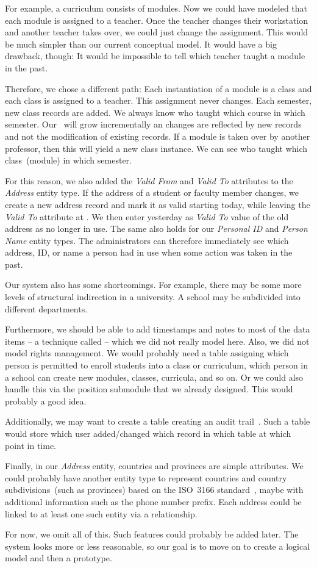 For example, a curriculum consists of modules.
Now we could have modeled that each module is assigned to a teacher.
Once the teacher changes their workstation and another teacher takes over, we could just change the assignment.
This would be much simpler than our current conceptual model.
It would have a big drawback, though:
It would be impossible to tell which teacher taught a module in the past.

Therefore, we chose a different path:
Each instantiation of a module is a class and each class is assigned to a teacher.
This assignment never changes.
Each semester, new class records are added.
We always know who taught which course in which semester.
Our \db\ will grow incrementally an changes are reflected by new records and not the modification of existing records.
If a module is taken over by another professor, then this will yield a new class instance.
We can see who taught which class~(module) in which semester.

For this reason, we also added the \emph{Valid From} and \emph{Valid To} attributes to the \emph{Address} entity type.
If the address of a student or faculty member changes, we create a new address record and mark it as valid starting today, while leaving the \emph{Valid To} attribute at .
We then enter yesterday as \emph{Valid To} value of the old address as no longer in use.
The same also holds for our \emph{Personal ID} and \emph{Person Name} entity types.
The administrators can therefore immediately see which address, ID, or name a person had in use when some action was taken in the past.

Our system also has some shortcomings.
For example, there may be some more levels of structural indirection in a university.
A school may be subdivided into different departments.

Furthermore, we should be able to add timestamps and notes to most of the data items -- a technique called  -- which we did not really model here.
Also, we did not model rights management.
We would probably need a table assigning which person is permitted to enroll students into a class or curriculum, which person in a school can create new modules, classes, curricula, and so on.
Or we could also handle this via the position submodule that we already designed.
This would probably a good idea.

Additionally, we may want to create a table creating an audit trail~\cite{K2010ATTDCID}.
Such a table would store which user added/changed which record in which table at which point in time.

Finally, in our \emph{Address} entity, countries and provinces are simple attributes.
We could probably have another entity type to represent countries and country subdivisions~(such as provinces) based on the ISO~3166 standard~\cite{ISO3166,HD2025IISC}, maybe with additional information such as the phone number prefix.
Each address could be linked to at least one such entity via a relationship.

For now, we omit all of this.
Such features could probably be added later.
The system looks more or less reasonable, so our goal is to move on to create a logical model and then a prototype.%
%
\FloatBarrier%
\endhsection%
%
